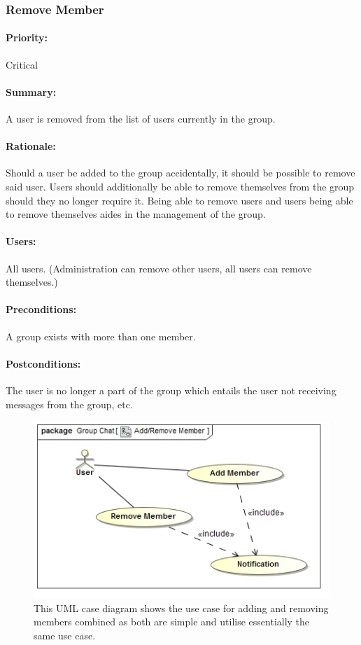 \documentclass[11pt]{article}
\begin{document}
\subsubsection{Remove Member} \label{UC-remove-member}
\paragraph{Priority:} Critical
\paragraph{Summary:}
A user is removed from the list of users currently in the group.
\paragraph{Rationale:}
Should a user be added to the group accidentally, it should be possible to remove said user. Users should additionally be able to remove themselves from the group should they no longer require it. Being able to remove users and users being able to remove themselves aides in the management of the group.
\paragraph{Users:}
All users. (Administration can remove other users, all users can remove themselves.)
\paragraph{Preconditions:}
A group exists with more than one member.
\paragraph{{Postconditions:}}
The user is no longer a part of the group which entails the user not receiving messages from the group, etc.
\begin{figure}[H]
\centering
\includegraphics[width=5in]{./images/UC_AddRemove_Member.jpg}
\caption[Add/Remove Member use case]{This UML case diagram shows the use case for adding and removing members combined as both are simple and utilise essentially the same use case.}
\label{UC-figure-addremove-member}
\end{figure}
\end{document}
